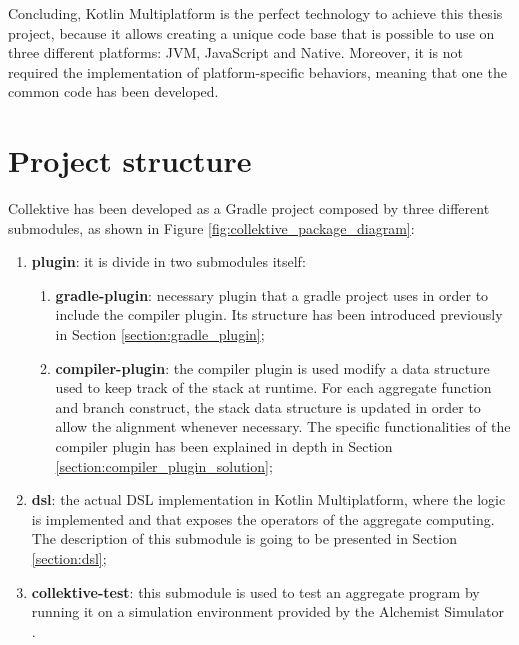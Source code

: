Concluding, Kotlin Multiplatform is the perfect technology to achieve this thesis project, because it allows creating a unique code base that is possible to use on three different platforms: JVM, JavaScript and Native. Moreover, it is not required the implementation of platform-specific behaviors, meaning that one the common code has been developed.

\section{Project structure}\label{section:project_structure}
Collektive has been developed as a Gradle project composed by three different submodules, as shown in Figure \ref{fig:collektive_package_diagram}:
\begin{enumerate}
    \item \textbf{plugin}: it is divide in two submodules itself: 
    \begin{enumerate}
        \item \textbf{gradle-plugin}: necessary plugin that a gradle project uses in order to include the compiler plugin. Its structure has been introduced previously in Section \ref{section:gradle_plugin};
        \item \textbf{compiler-plugin}: the compiler plugin is used modify a data structure used to keep track of the stack at runtime. For each aggregate function and branch construct, the stack data structure is updated in order to allow the alignment whenever necessary. The specific functionalities of the compiler plugin has been explained in depth in Section \ref{section:compiler_plugin_solution}; 
    \end{enumerate}
    \item \textbf{dsl}: the actual DSL implementation in Kotlin Multiplatform, where the logic is implemented and that exposes the operators of the aggregate computing. The description of this submodule is going to be presented in Section \ref{section:dsl};
    \item \textbf{collektive-test}: this submodule is used to test an aggregate program by running it on a simulation environment provided by the Alchemist Simulator \cite{alchemist}.
\end{enumerate}
